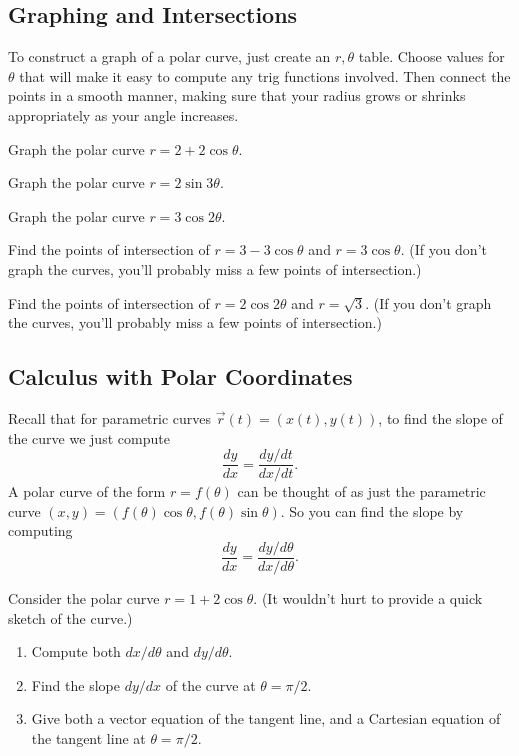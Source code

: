 \subsection{Graphing and Intersections}
To construct a graph of a polar curve, just create an $r,\theta$ table. Choose values for $\theta$ that will make it easy to compute any trig functions involved. Then connect the points in a smooth manner, making sure that your radius grows or shrinks appropriately as your angle increases.  

\begin{problem} 
%
Graph the polar curve $r=2+2\cos\theta$.
\end{problem}

\begin{problem}
Graph the polar curve $r=2\sin 3\theta$.
\end{problem}

\begin{problem}
Graph the polar curve $r=3\cos 2\theta$.
\end{problem}


\begin{problem}
Find the points of intersection of $r=3-3\cos\theta$ and $r=3\cos\theta$. (If you don't graph the curves, you'll probably miss a few points of intersection.)
\end{problem}

\begin{problem}
Find the points of intersection of $r=2\cos 2\theta $ and $r=\sqrt 3$. (If you don't graph the curves, you'll probably miss a few points of intersection.)
\end{problem}


\subsection{Calculus with Polar Coordinates}

Recall that for parametric curves $\vec r(t) = (x(t),y(t))$, to find the slope of the curve we just compute $$\frac{dy}{dx}=\frac{dy/dt}{dx/dt}.$$ A polar curve of the form $r=f(\theta)$ can be thought of as just the parametric curve $(x,y) = (f(\theta)\cos\theta,f(\theta)\sin\theta)$. So you can find the slope by computing
$$\frac{dy}{dx}=\frac{dy/d\theta}{dx/d\theta}.$$

\begin{problem}
%
Consider the polar curve $r=1+2\cos \theta$. (It wouldn't hurt to provide a quick sketch of the curve.)
\begin{enumerate}
\item Compute both $dx/d\theta$ and $dy/d\theta$.
\item Find the slope $dy/dx$ of the curve at $\theta=\pi/2$.
\item Give both a vector equation of the tangent line, and a Cartesian equation of the tangent line at $\theta=\pi/2$.
\end{enumerate}
\end{problem}

